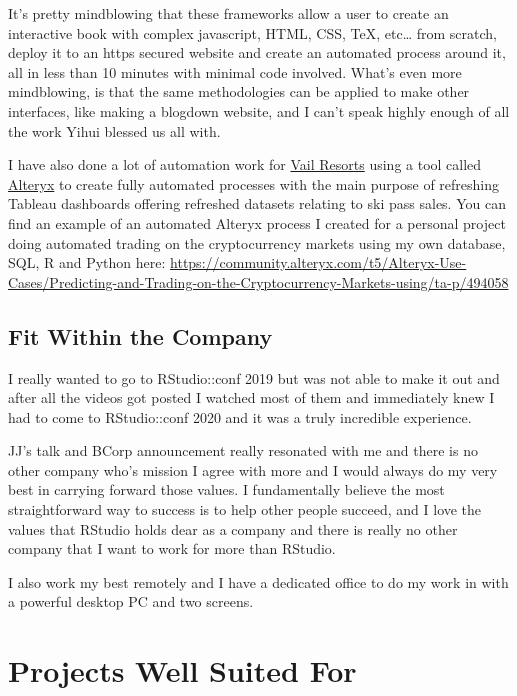 \documentclass[
]{book}
\begin{document}
It's pretty mindblowing that these frameworks allow a user to create an interactive book with complex javascript, HTML, CSS, TeX, etc\ldots{} from scratch, deploy it to an https secured website and create an automated process around it, all in less than 10 minutes with minimal code involved. What's even more mindblowing, is that the same methodologies can be applied to make other interfaces, like making a blogdown website, and I can't speak highly enough of all the work Yihui blessed us all with.

I have also done a lot of automation work for \href{https://www.google.com/search?q=vail+resorts+stock}{Vail Resorts} using a tool called \href{https://www.alteryx.com/}{Alteryx} to create fully automated processes with the main purpose of refreshing Tableau dashboards offering refreshed datasets relating to ski pass sales. You can find an example of an automated Alteryx process I created for a personal project doing automated trading on the cryptocurrency markets using my own database, SQL, R and Python here: \url{https://community.alteryx.com/t5/Alteryx-Use-Cases/Predicting-and-Trading-on-the-Cryptocurrency-Markets-using/ta-p/494058}

\hypertarget{rstudio}{%
\section{Fit Within the Company}\label{rstudio}}

I really wanted to go to RStudio::conf 2019 but was not able to make it out and after all the videos got posted I watched most of them and immediately knew I had to come to RStudio::conf 2020 and it was a truly incredible experience.

JJ's talk and BCorp announcement really resonated with me and there is no other company who's mission I agree with more and I would always do my very best in carrying forward those values. I fundamentally believe the most straightforward way to success is to help other people succeed, and I love the values that RStudio holds dear as a company and there is really no other company that I want to work for more than RStudio.

I also work my best remotely and I have a dedicated office to do my work in with a powerful desktop PC and two screens.

\hypertarget{ideal-projects}{%
\chapter{Projects Well Suited For}\label{ideal-projects}}
\end{document}
